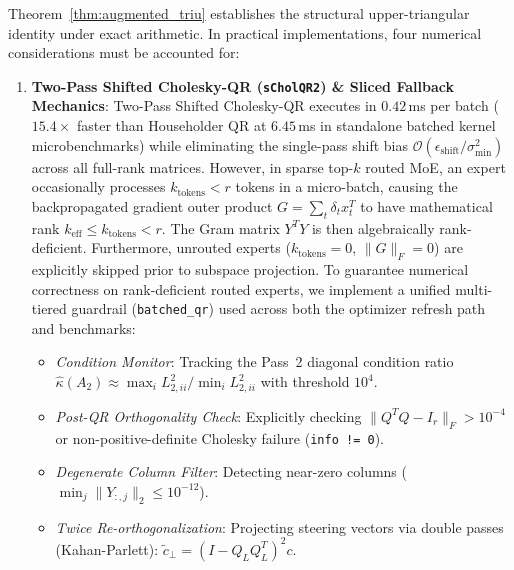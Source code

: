 \documentclass[10pt,twocolumn,letterpaper]{article}
\begin{document}
Theorem~\ref{thm:augmented_triu} establishes the structural upper-triangular identity under exact arithmetic. In practical implementations, four numerical considerations must be accounted for:
\begin{enumerate}
    \item \textbf{Two-Pass Shifted Cholesky-QR (\texttt{sCholQR2}) \& Sliced Fallback Mechanics}: Two-Pass Shifted Cholesky-QR executes in $0.42$\,ms per batch ($15.4\times$ faster than Householder QR at $6.45$\,ms in standalone batched kernel microbenchmarks) while eliminating the single-pass shift bias $\mathcal{O}(\epsilon_{\text{shift}} / \sigma_{\min}^2)$ across all full-rank matrices. However, in sparse top-$k$ routed MoE, an expert occasionally processes $k_{\text{tokens}} < r$ tokens in a micro-batch, causing the backpropagated gradient outer product $G = \sum_{t} \delta_t x_t^T$ to have mathematical rank $k_{\text{eff}} \le k_{\text{tokens}} < r$. The Gram matrix $Y^T Y$ is then algebraically rank-deficient. Furthermore, unrouted experts ($k_{\text{tokens}} = 0$, $\|G\|_F = 0$) are explicitly skipped prior to subspace projection. To guarantee numerical correctness on rank-deficient routed experts, we implement a unified multi-tiered guardrail (\texttt{batched\_qr}) used across both the optimizer refresh path and benchmarks:
    \begin{itemize}
        \item \emph{Condition Monitor}: Tracking the Pass~2 diagonal condition ratio $\hat{\kappa}(A_2) \approx \max_i L_{2,ii}^2 / \min_i L_{2,ii}^2$ with threshold $10^4$.
        \item \emph{Post-QR Orthogonality Check}: Explicitly checking $\|Q^T Q - I_r\|_F > 10^{-4}$ or non-positive-definite Cholesky failure (\texttt{info != 0}).
        \item \emph{Degenerate Column Filter}: Detecting near-zero columns ($\min_j \|Y_{:, j}\|_2 \le 10^{-12}$).
        \item \emph{Twice Re-orthogonalization}: Projecting steering vectors via double passes (Kahan-Parlett): $\tilde{c}_\perp = (I - Q_L Q_L^T)^2 c$.

\end{itemize}
\end{enumerate}
\end{document}

